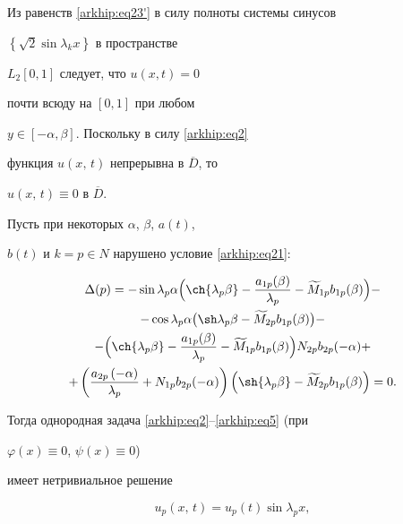 Из равенств \eqref{arkhip:eq23'}  в силу полноты системы синусов

$\left\{\sqrt{2} \sin{\lambda_{k}x}\right\}$ в пространстве

$L_{2}\left[{0, 1}\right]$ следует, что $u\left({x,t}\right) = 0$

почти всюду на $\left[{0, 1}\right]$ при любом

$y\in\left[{-\alpha,\beta}\right]$. Поскольку в силу \eqref{arkhip:eq2}

функция $u\left({x,\,t}\right)$ непрерывна в $\overline {D}$, то

$u\left({x,\,t}\right) \equiv {0}$ в $\overline {D}$.



Пусть при некоторых $\alpha$, $\beta$, $a(t)$,

$b(t)$ и $k = p \in N$ нарушено условие \eqref{arkhip:eq21}:

\begin{multline}

\Delta( p ) = -\sin{\lambda_{p}\alpha}\Bigl(\ch{\lambda_{p}\beta} - \frac{a_{1 p} (\beta)}{\lambda_{p}} - \widetilde M_{1 p}b_{1 p}(\beta)\Bigr) -

\\

- \cos{\lambda_{p}\alpha}\bigl(\sh\lambda_{p}\beta - \widetilde M_{2 p}b_{1 p}(\beta)\bigr)-

\\

- \Bigl(\ch{\lambda_{p} \beta} - \frac{a_{1 p} (\beta)}{\lambda_{p}} - \widetilde M_{1 p}b_{1 p}(\beta)\Bigr)N_{2 p}b_{2 p}(-\alpha) +

\\

+\left( \frac{a_{2 p} \left({-\alpha}\right)}{\lambda_{p}} + N_{1 p}b_{2 p}(-\alpha)\right)\left(\sh{\lambda_{p} \beta }- \widetilde M_{2 p}b_{1 p}(\beta)\right) = 0.

\label{arkhip:eq23}

\end{multline}

Тогда однородная задача \eqref{arkhip:eq2}--\eqref{arkhip:eq5} (при

$\varphi( x )\equiv{0}$, $\psi( x )\equiv{0}$)

имеет нетривиальное решение

\begin{equation}\label{arkhip:eq24}

u_{p}\left({x,\,t}\right) = u_{p}(t)\sin{\lambda_{p}x},

\end{equation}

